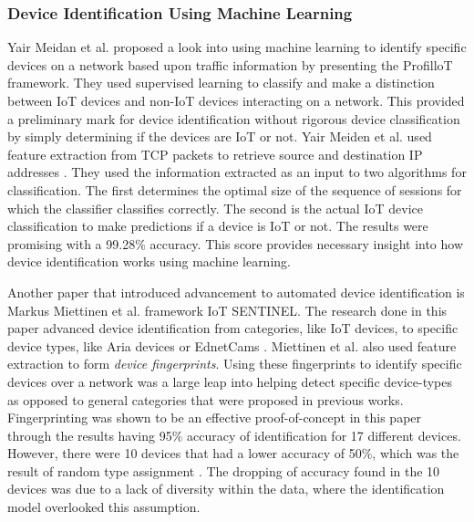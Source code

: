 \documentclass[11pt, titlepage]{article}
\begin{document}
		\subsubsection{Device Identification Using Machine Learning}
	Yair Meidan et al. proposed a look into using machine learning to identify specific devices on a network based upon traffic information by presenting the ProfilloT framework. They used supervised learning to classify and make a distinction between IoT devices and non-IoT devices interacting on a network. This provided a preliminary mark for device identification without rigorous device classification by simply determining if the devices are IoT or not. Yair Meiden et al. used feature extraction from TCP packets to retrieve source and destination IP addresses \cite{Profolit}. They used the information extracted as an input to two algorithms for classification. The first determines the optimal size of the sequence of sessions for which the classifier classifies correctly. The second is the actual IoT device classification to make predictions if a device is IoT or not. The results were promising with a 99.28\% accuracy. This score provides necessary insight into how device identification works using machine learning.

	Another paper that introduced advancement to automated device identification is Markus Miettinen et al. framework IoT SENTINEL. The research done in this paper advanced device identification from categories, like IoT devices, to specific device types, like Aria devices or EdnetCams \cite{Sentinel}. Miettinen et al. also used feature extraction to form \textit{device fingerprints}. Using these fingerprints to identify specific devices over a network was a large leap into helping detect specific device-types as opposed to general categories that were proposed in previous works. Fingerprinting was shown to be an effective proof-of-concept in this paper through the results having 95\% accuracy of identification for 17 different devices. However, there were 10 devices that had a lower accuracy of 50\%, which was the result of random type assignment \cite{Sentinel}. The dropping of accuracy found in the 10 devices was due to a lack of diversity within the data, where the identification model overlooked this assumption.
		
\end{document}

